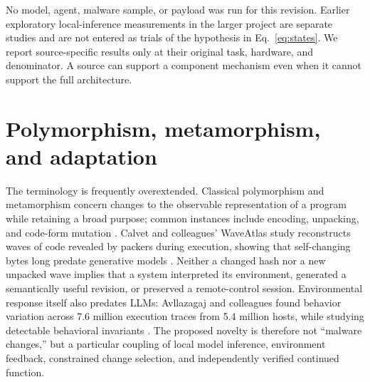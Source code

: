 \documentclass[11pt,letterpaper]{article}
\begin{document}
No model, agent, malware sample, or payload was run for this revision. Earlier exploratory local-inference measurements in the larger project are separate studies and are not entered as trials of the hypothesis in Eq.~\ref{eq:states}. We report source-specific results only at their original task, hardware, and denominator. A source can support a component mechanism even when it cannot support the full architecture.

\section{Polymorphism, metamorphism, and adaptation}\label{sec:polymorphism}

The terminology is frequently overextended. Classical polymorphism and metamorphism concern changes to the observable representation of a program while retaining a broad purpose; common instances include encoding, unpacking, and code-form mutation \cite{mitrepoly,wongstamp}. Calvet and colleagues' WaveAtlas study reconstructs waves of code revealed by packers during execution, showing that self-changing bytes long predate generative models \cite{waveatlas}. Neither a changed hash nor a new unpacked wave implies that a system interpreted its environment, generated a semantically useful revision, or preserved a remote-control session. Environmental response itself also predates LLMs: Avllazagaj and colleagues found behavior variation across 7.6 million execution traces from 5.4 million hosts, while studying detectable behavioral invariants \cite{avllazagaj}. The proposed novelty is therefore not ``malware changes,'' but a particular coupling of local model inference, environment feedback, constrained change selection, and independently verified continued function.
\end{document}
